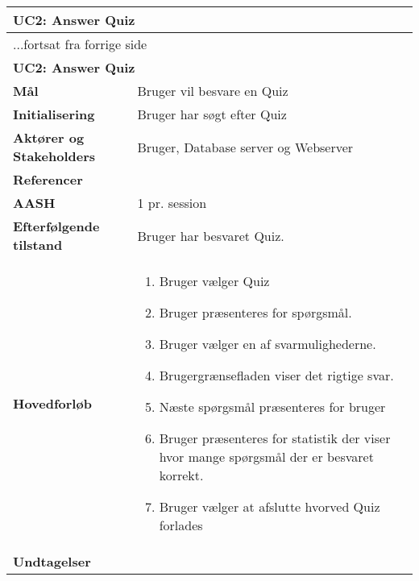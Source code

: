 \begin{center} \centering \label{ucAnswerQuiz}
	\begin{longtable}{|p{4.6cm}|p{9.4cm}|}  %
		\hline
		\multicolumn{2}{|l|}{\textbf{UC2: Answer Quiz}} \\\hline
		\endfirsthead
		
		\multicolumn{2}{l}{...fortsat fra forrige side} \\ \hline %
		\multicolumn{2}{|l|}{\textbf{UC2: Answer Quiz}} \\\hline
		\endhead	
		
		\textbf{Mål}						&Bruger vil besvare en Quiz
		\\\hline
		\textbf{Initialisering}			&Bruger har søgt efter Quiz
		\\\hline
		\textbf{Aktører og Stakeholders}	&Bruger, Database server og Webserver
		\\\hline 
		\textbf{Referencer}				&
		\\\hline
		\textbf{AASH}					&1 pr. session
		\\\hline
		\textbf{Efterfølgende tilstand}	&Bruger har besvaret Quiz.
		\\\hline
		\textbf{Hovedforløb}					
			&\begin{enumerate}
			\item Bruger vælger Quiz
			\item\label{ucAnswerQuizQPresent} Bruger præsenteres for spørgsmål.
			\item Bruger vælger en af svarmulighederne. 
			\item Brugergrænsefladen viser det rigtige svar.

			\item\label{ucAnswerQuizQEnd} Næste spørgsmål præsenteres for bruger \newline
			[Punkt \ref{ucAnswerQuizQPresent} - \ref{ucAnswerQuizQEnd} gentages indtil der ikke er flere spørgsmål i Quizzen]
			\item Bruger præsenteres for statistik der viser hvor mange spørgsmål der er besvaret korrekt.
			\item Bruger vælger at afslutte hvorved Quiz forlades


			\end{enumerate}\\\hline
		\textbf{Undtagelser}
			&			
			\\\hline
	\end{longtable} 
\end{center}
